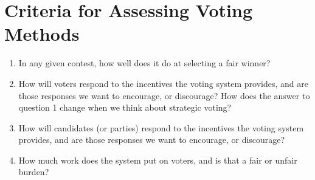 \section{Criteria for Assessing Voting Methods}
\label{criteriaforassessingvotingmethods}

\begin{enumerate}
\item{} In any given contest, how well does it do at selecting a fair winner?

\item{} How will voters respond to the incentives the voting system provides, and are those responses we want to encourage, or discourage? How does the answer to question 1 change when we think about strategic voting?

\item{} How will candidates (or parties) respond to the incentives the voting system provides, and are those responses we want to encourage, or discourage?

\item{} How much work does the system put on voters, and is that a fair or unfair burden?

\end{enumerate}


